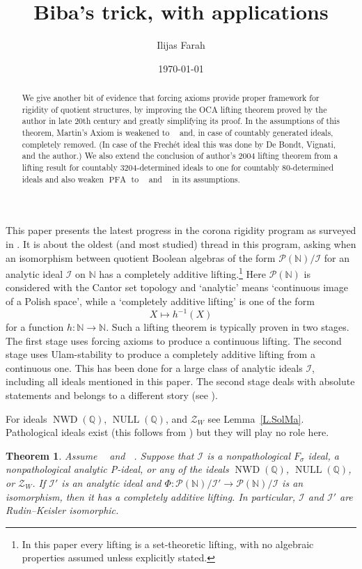\documentclass{amsart}
\title{Biba's trick, with applications}
\author{Ilijas Farah}
\date{\today}
\def\text{\mbox}
\newtheorem{thm}{Theorem}
\theoremstyle{definition}
\theoremstyle{remark}
\newcommand{\cP}{\mathcal P}
\newcommand{\bbN}{\mathbb N}
\newcommand{\bbQ}{\mathbb Q}
\newcommand{\cI}{{\mathcal I}} %
\newcommand{\cZ}{\mathcal Z}
\DeclareMathOperator{\OCAT}{OCA_T}
\DeclareMathOperator{\NWD}{NWD}
\DeclareMathOperator{\NULL}{NULL}
\DeclareMathOperator{\MAsigma}{MA(\sigma-\text{linked})}
\DeclareMathOperator{\PFA}{PFA}
\newcommand{\cPN}{\cP(\bbN)}
\numberwithin{claim}{subsection}
\begin{document}
\maketitle

\begin{abstract}
	We give another bit of evidence that forcing axioms provide proper framework for rigidity of quotient structures, by improving the OCA lifting theorem proved by the author in late 20th century and greatly simplifying its proof. In the assumptions of this theorem, Martin’s Axiom is weakened to $\MAsigma$ and, in case of countably generated ideals, completely removed. (In case of the Frech\' et ideal this was done by De Bondt, Vignati, and the author.)  We also extend the conclusion of author’s 2004 lifting theorem from a lifting result for countably 3204-determined ideals to one for countably 80-determined ideals and  also weaken $\PFA$ to $\OCAT$ and $\MAsigma$ in its assumptions. 
\end{abstract}


This paper presents the latest progress in the corona rigidity program as surveyed in \cite{farah2022corona}. It is about the oldest (and most studied) thread in this program, asking when an isomorphism between quotient Boolean algebras of the form $\cPN/\cI$ for an analytic ideal $\cI$ on $\bbN$ has a completely additive lifting.\footnote{In this paper every lifting is a set-theoretic lifting, with no algebraic properties assumed unless explicitly stated.}  
Here $\cPN$ is considered with the Cantor set topology and `analytic' means `continuous image of a Polish space', while a `completely additive lifting' is one of the form 
\[
X\mapsto h^{-1}(X)
\]
for a function $h\colon \bbN\to \bbN$.  
Such a lifting theorem is typically proven in two stages. The first stage uses forcing axioms to produce a continuous lifting. The second stage uses Ulam-stability to produce a completely additive lifting from a continuous one. This has been done for a large class of analytic ideals $\cI$, including all ideals mentioned in this paper.  
 The second stage deals with absolute statements and belongs to a different story  (see \cite[\S 2 and \S 5.3]{farah2022corona}). 


For ideals $\NWD( \bbQ)$, $\NULL( \bbQ)$,
and $\cZ_W$ see Lemma~\ref{L.SolMa}. 
Pathological ideals exist (this follows from \cite[Theorem~1.8.6]{Fa:AQ}) but they will play no role here.  

\begin{thm} \label{T.Main} Assume  $\OCAT$  and $\MAsigma$. Suppose that $\cI$ is a nonpathological  $F_\sigma$ ideal, a nonpathological analytic P-ideal, or any of the ideals $\NWD( \bbQ)$, $\NULL( \bbQ)$,
	or $\cZ_W$. 	If $\cI'$ is an analytic ideal and  $\Phi\colon \cP(\bbN)/\cI'\to \cP(\bbN)/\cI$ is an isomorphism, then it has a completely additive lifting. In particular, $\cI$ and $\cI'$ are Rudin--Keisler isomorphic. 
	\end{thm}
\end{document}
